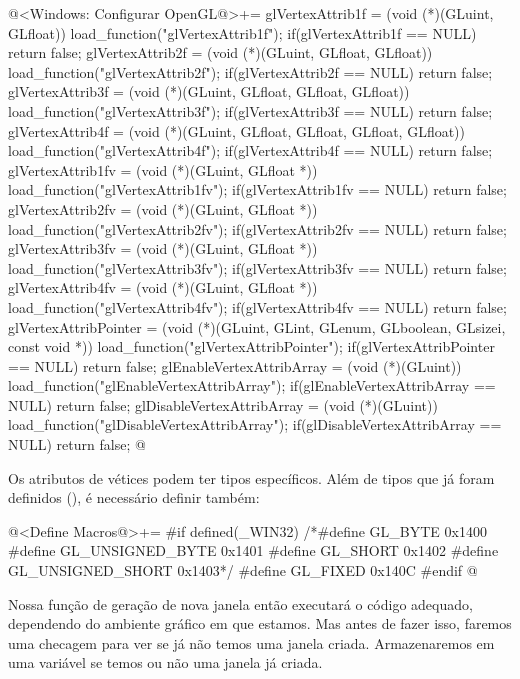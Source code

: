 \iniciocodigo
@<Windows: Configurar OpenGL@>+=
glVertexAttrib1f = (void (*)(GLuint, GLfloat)) load_function("glVertexAttrib1f");
if(glVertexAttrib1f == NULL) return false;
glVertexAttrib2f = (void (*)(GLuint, GLfloat, GLfloat))
                      load_function("glVertexAttrib2f");
if(glVertexAttrib2f == NULL) return false;
glVertexAttrib3f = (void (*)(GLuint, GLfloat, GLfloat, GLfloat))
                      load_function("glVertexAttrib3f");
if(glVertexAttrib3f == NULL) return false;
glVertexAttrib4f = (void (*)(GLuint, GLfloat, GLfloat, GLfloat, GLfloat))
                      load_function("glVertexAttrib4f");
if(glVertexAttrib4f == NULL) return false;
glVertexAttrib1fv = (void (*)(GLuint, GLfloat *))
                       load_function("glVertexAttrib1fv");
if(glVertexAttrib1fv == NULL) return false;
glVertexAttrib2fv = (void (*)(GLuint, GLfloat *))
                       load_function("glVertexAttrib2fv");
if(glVertexAttrib2fv == NULL) return false;
glVertexAttrib3fv = (void (*)(GLuint, GLfloat *))
                       load_function("glVertexAttrib3fv");
if(glVertexAttrib3fv == NULL) return false;
glVertexAttrib4fv = (void (*)(GLuint, GLfloat *))
                       load_function("glVertexAttrib4fv");
if(glVertexAttrib4fv == NULL) return false;
glVertexAttribPointer = (void (*)(GLuint, GLint, GLenum, GLboolean,
                         GLsizei, const void *))
                              load_function("glVertexAttribPointer");
if(glVertexAttribPointer == NULL) return false;
glEnableVertexAttribArray = (void (*)(GLuint))
                              load_function("glEnableVertexAttribArray");
if(glEnableVertexAttribArray == NULL) return false;
glDisableVertexAttribArray = (void (*)(GLuint))
                               load_function("glDisableVertexAttribArray");
if(glDisableVertexAttribArray == NULL) return false;
@
\fimcodigo

Os atributos de vétices podem ter tipos específicos. Além de tipos que
já foram definidos (), é necessário definir
também:

\iniciocodigo
@<Define Macros@>+=
#if defined(_WIN32)
/*#define GL_BYTE           0x1400
#define GL_UNSIGNED_BYTE  0x1401
#define GL_SHORT          0x1402
#define GL_UNSIGNED_SHORT 0x1403*/
#define GL_FIXED          0x140C
#endif
@
\fimcodigo



Nossa função de geração de nova janela então executará o código
adequado, dependendo do ambiente gráfico em que estamos. Mas antes de
fazer isso, faremos uma checagem para ver se já não temos uma janela
criada. Armazenaremos em uma variável se temos ou não uma janela já
criada.

